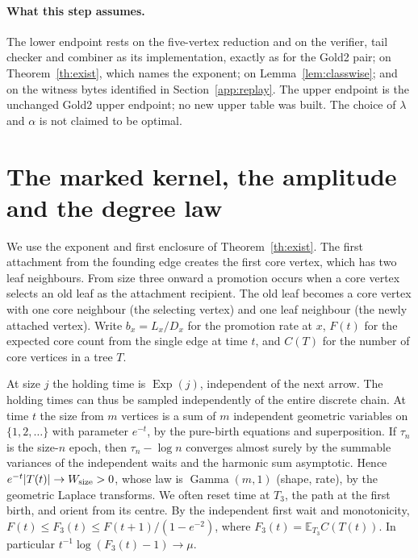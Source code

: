 \documentclass[11pt]{article}
\newcommand{\sectag}[1]{\renewcommand{\thesection}{#1}\renewcommand{\theHsection}{#1}}
\theoremstyle{remark}
\numberwithin{equation}{section}
\begin{document}
\paragraph{What this step assumes.}
The lower endpoint rests on the five-vertex reduction and on the verifier, tail checker and combiner as its implementation, exactly as for the Gold2 pair; on Theorem~\ref{th:exist}, which names the exponent; on Lemma~\ref{lem:classwise}; and on the witness bytes identified in Section~\ref{app:replay}. The upper endpoint is the unchanged Gold2 upper endpoint; no new upper table was built. The choice of $\lambda$ and $\alpha$ is not claimed to be optimal.

\sectag{CORE}
\section{The marked kernel, the amplitude and the degree law}\label{sec:core}\label{sec:core-details}
We use the exponent and first enclosure of Theorem~\ref{th:exist}. The first attachment from the founding edge creates the first core vertex, which has two leaf neighbours. From size three onward a promotion occurs when a core vertex selects an old leaf as the attachment recipient. The old leaf becomes a core vertex with one core neighbour (the selecting vertex) and one leaf neighbour (the newly attached vertex). Write $b_x=L_x/D_x$ for the promotion rate at $x$, $F(t)$ for the expected core count from the single edge at time $t$, and $C(T)$ for the number of core vertices in a tree $T$.

At size $j$ the holding time is $\operatorname{Exp}(j)$, independent of the next arrow. The holding times can thus be sampled independently of the entire discrete chain. At time $t$ the size from $m$ vertices is a sum of $m$ independent geometric variables on $\{1,2,\ldots\}$ with parameter $e^{-t}$, by the pure-birth equations and superposition. If $\tau_n$ is the size-$n$ epoch, then $\tau_n-\log n$ converges almost surely by the summable variances of the independent waits and the harmonic sum asymptotic. Hence $e^{-t}|T(t)|\to W_{\rm size}>0$, whose law is $\operatorname{Gamma}(m,1)$ (shape, rate), by the geometric Laplace transforms. We often reset time at $T_3$, the path at the first birth, and orient from its centre. By the independent first wait and monotonicity, $F(t)\le F_3(t)\le F(t+1)/(1-e^{-2})$, where $F_3(t)=\mathbb E_{T_3}C(T(t))$. In particular $t^{-1}\log(F_3(t)-1)\to\mu$.
\end{document}
